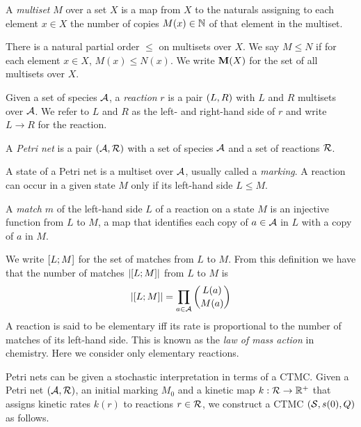 \begin{definition}
  A \emph{multiset} $M$ over a set $X$ is a map from $X$ to
  the naturals assigning to each element $x \in X$
  the number of copies $M(x) \in \mathbb{N}$ of that element
  in the multiset.
\end{definition}

There is a natural partial order $\leqslant$ on multisets over $X$.
We say $M \leqslant N$ if for each element $x \in X$,
$M(x) \leqslant N(x)$.
We write $\mathbf{M}(X)$ for the set of all multisets over $X$.


\begin{definition}
  Given a set of species $\mathcal{A}$,
  a \emph{reaction} $r$ is a pair $\left(L,R\right)$
  with $L$ and $R$ multisets over $\mathcal{A}$.
  We refer to $L$ and $R$ as the left- and right-hand side of $r$
  and write $L \to R$ for the reaction.
\end{definition}

\begin{definition}%
  A \emph{Petri net} is a pair $\left(\mathcal{A}, \mathcal{R}\right)$ with
  a set of species $\mathcal{A}$ and a set of reactions $\mathcal{R}$.
\end{definition}

A state of a Petri net is a multiset over $\mathcal{A}$,
usually called a \emph{marking}.
A reaction can occur in a given state $M$ only if
its left-hand side $L \leqslant M$.

\begin{definition}
  A \emph{match} $m$ of the left-hand side $L$ of a reaction
  on a state $M$ is an injective function from $L$ to $M$,
  \ie a map that identifies each copy of $a \in \mathcal{A}$ in $L$
  with a copy of $a$ in $M$.
\end{definition}

We write $\left[L;M\right]$ for the set of matches from $L$ to $M$.
From this definition we have that the number of matches
$\left\lvert \left[L;M\right] \right\rvert$ from $L$ to $M$ is
\[ \left\lvert \left[L;M\right] \right\rvert = \prod_{a \in \mathcal{A}} \binom{L(a)}{M(a)} \]
A reaction is said to be elementary iff its rate is
proportional to the number of matches of its left-hand side.
This is known as the \emph{law of mass action} in chemistry.
Here we consider only elementary reactions.

Petri nets can be given a stochastic interpretation
in terms of a CTMC.
Given a Petri net $\left(\mathcal{A}, \mathcal{R}\right)$,
an initial marking $M_0$ and
a kinetic map $k: \mathcal{R} \to \mathbb{R}^+$ that assigns
kinetic rates $k(r)$ to reactions $r \in \mathcal{R}$,
we construct a CTMC $\left(\mathcal{S}, s(0), Q\right)$ as follows.

